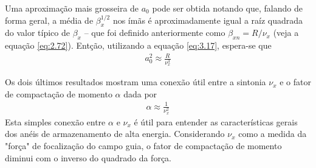 Uma aproximação mais grosseira de $a_0$ pode ser obtida notando que, falando de forma geral, a média de $\beta_x^{1/2}$ nos ímãs é aproximadamente igual a raíz quadrada do valor típico de $\beta_x$ -- que foi definido anteriormente como $\beta_{xn} = R/\nu_x$ (veja a equação \eqref{eq:2.72}). Entção, utilizando a equação \eqref{eq:3.17}, espera-se que
\begin{align}
	a_0^2 \approx \frac{R}{\nu_x^3}
\end{align}

Os dois últimos resultados mostram uma conexão útil entre a sintonia $\nu_x$ e o fator de compactação de momento $\alpha$ dada por
\begin{align}
	\alpha \approx \frac{1}{\nu_x^2}
\end{align}
Esta simples conexão entre $\alpha$ e $\nu_x$ é útil para entender as características gerais dos anéis de armazenamento de alta energia. Considerando $\nu_x$ como a medida da "força" de focalização do campo guia, o fator de compactação de momento diminui com o inverso do quadrado da força.